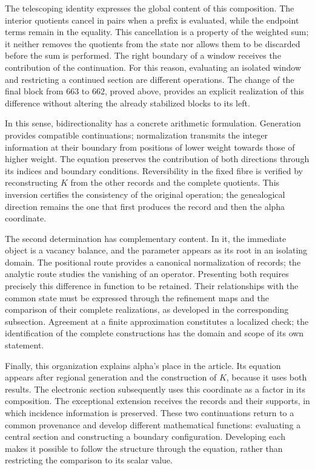 The telescoping identity expresses the global content of this composition.
The interior quotients cancel in pairs when a prefix is evaluated,
while the endpoint terms remain in the equality. This cancellation is
a property of the weighted sum; it neither removes the quotients from the state nor
allows them to be discarded before the sum is performed. The right boundary of a
window receives the contribution of the continuation. For this reason,
evaluating an isolated window and restricting a continued section
are different operations. The change of the final block from $663$ to
$662$, proved above, provides an explicit realization of this
difference without altering the already stabilized blocks to its left.

In this sense, bidirectionality has a concrete arithmetic
formulation. Generation provides compatible continuations;
normalization transmits the integer information at their boundary from
positions of lower weight towards those of higher weight. The equation preserves the
contribution of both directions through its indices and boundary
conditions. Reversibility in the fixed fibre is verified by reconstructing
$K$ from the other records and the complete quotients. This
inversion certifies the consistency of the original operation; the genealogical
direction remains the one that first produces the record and then
the alpha coordinate.

The second determination has complementary content. In it, the
immediate object is a vacancy balance, and the parameter appears as
its root in an isolating domain. The positional route provides a
canonical normalization of records; the analytic route studies the vanishing
of an operator. Presenting both requires precisely this difference
in function to be retained. Their relationships with the common state must
be expressed through the refinement maps and the comparison of
their complete realizations, as developed in the corresponding
subsection. Agreement at a finite approximation constitutes a
localized check; the identification of the complete constructions
has the domain and scope of its own statement.

Finally, this organization explains alpha's place in the article.
Its equation appears after regional generation and the construction
of $K$, because it uses both results. The electronic section subsequently
uses this coordinate as a factor in its composition. The exceptional
extension receives the records and their supports, in which incidence
information is preserved. These two continuations return to a common
provenance and develop different mathematical functions: evaluating a
central section and constructing a boundary configuration.
Developing each makes it possible to follow the structure through the
equation, rather than restricting the comparison to its scalar value.

